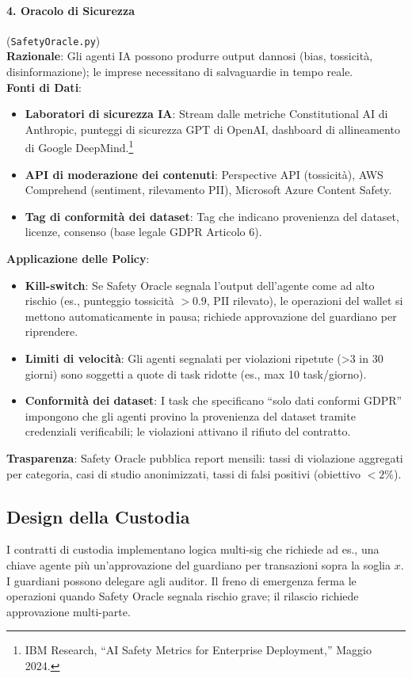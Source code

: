 \documentclass[11pt]{article}
\begin{document}
\paragraph{4. Oracolo di Sicurezza} (\texttt{SafetyOracle.py})\\
\textbf{Razionale}: Gli agenti IA possono produrre output dannosi (bias, tossicità, disinformazione); le imprese necessitano di salvaguardie in tempo reale.\\
\textbf{Fonti di Dati}:
\begin{itemize}[noitemsep]
  \item \textbf{Laboratori di sicurezza IA}: Stream dalle metriche Constitutional AI di Anthropic, punteggi di sicurezza GPT di OpenAI, dashboard di allineamento di Google DeepMind.\footnote{IBM Research, ``AI Safety Metrics for Enterprise Deployment,'' Maggio 2024.}
  \item \textbf{API di moderazione dei contenuti}: Perspective API (tossicità), AWS Comprehend (sentiment, rilevamento PII), Microsoft Azure Content Safety.
  \item \textbf{Tag di conformità dei dataset}: Tag che indicano provenienza del dataset, licenze, consenso (base legale GDPR Articolo 6).
\end{itemize}
\textbf{Applicazione delle Policy}:
\begin{itemize}[noitemsep]
  \item \textbf{Kill-switch}: Se Safety Oracle segnala l'output dell'agente come ad alto rischio (es., punteggio tossicità $>0.9$, PII rilevato), le operazioni del wallet si mettono automaticamente in pausa; richiede approvazione del guardiano per riprendere.
  \item \textbf{Limiti di velocità}: Gli agenti segnalati per violazioni ripetute (>3 in 30 giorni) sono soggetti a quote di task ridotte (es., max 10 task/giorno).
  \item \textbf{Conformità dei dataset}: I task che specificano ``solo dati conformi GDPR'' impongono che gli agenti provino la provenienza del dataset tramite credenziali verificabili; le violazioni attivano il rifiuto del contratto.
\end{itemize}
\textbf{Trasparenza}: Safety Oracle pubblica report mensili: tassi di violazione aggregati per categoria, casi di studio anonimizzati, tassi di falsi positivi (obiettivo $<2\%$).

\subsection{Design della Custodia}
I contratti di custodia implementano logica multi-sig che richiede ad es., una chiave agente più un'approvazione del guardiano per transazioni sopra la soglia $x$. I guardiani possono delegare agli auditor. Il freno di emergenza ferma le operazioni quando Safety Oracle segnala rischio grave; il rilascio richiede approvazione multi-parte.
\end{document}
